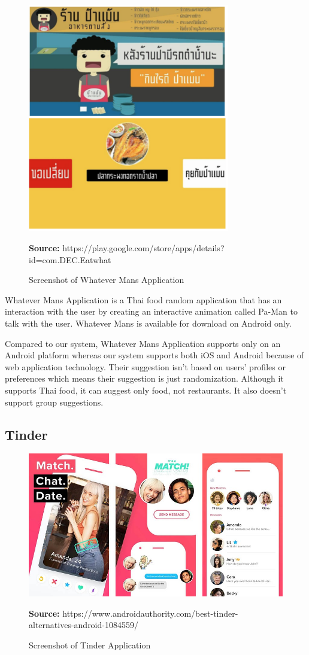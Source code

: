 \documentclass[12pt,oneside,openright,a4paper]{cpe-english-project}
\newcommand*{\captionsource}[2]{%
  \caption[{#1}]{#1}\vspace{-8pt}
  \textbf{Source:} #2}
\begin{document}
\begin{figure}[!h]\centering
\includegraphics[width=250pt]{./images/2whatman.png}
\label{fig:2whatman}
\captionsource{Screenshot of Whatever Mans Application}{https://play.google.com/store/apps/details?id=com.DEC.Eatwhat}
\end{figure}

Whatever Mans Application is a Thai food random application that has an interaction with the user by creating an interactive animation called Pa-Man to talk with the user. Whatever Mans is available for download on Android only.

Compared to our system, Whatever Mans Application supports only on an Android platform whereas our system supports both iOS and Android because of web application technology. Their suggestion isn't based on users’ profiles or preferences which means their suggestion is just randomization. Although it supports Thai food, it can suggest only food, not restaurants. It also doesn’t support group suggestions.

\newpage
\subsection{Tinder}

\begin{figure}[!h]\centering
\includegraphics[width=400pt]{./images/2tinder.jpeg}
\label{fig:2tinder}
\captionsource{Screenshot of Tinder Application}{https://www.androidauthority.com/best-tinder-alternatives-android-1084559/}
\end{figure}
\end{document}
